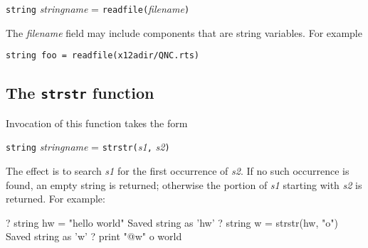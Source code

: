 \texttt{string} \textsl{stringname} = \texttt{readfile(}\textsl{filename}\texttt{)}

The \textsl{filename} field may include components that are
string variables.  For example

\verb|string foo = readfile(x12adir/QNC.rts)|

\subsection{The \texttt{strstr} function}

Invocation of this function takes the form

\texttt{string} \textsl{stringname} = 
\texttt{strstr(}\textsl{s1}\texttt{,} \textsl{s2}\texttt{)}

The effect is to search \textsl{s1} for the first occurrence of
\textsl{s2}.  If no such occurrence is found, an empty string is
returned; otherwise the portion of \textsl{s1} starting with
\textsl{s2} is returned.  For example:
%
\begin{code}
? string hw = "hello world"
Saved string as 'hw'
? string w = strstr(hw, "o")
Saved string as 'w'
? print "@w"
o world
\end{code}
%


    

